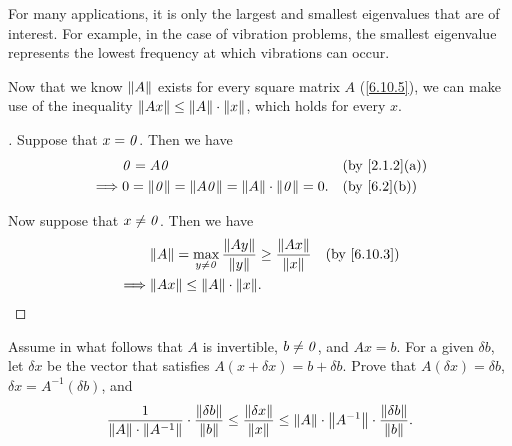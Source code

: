 \begin{note}
  For many applications, it is only the largest and smallest eigenvalues that are of interest.
  For example, in the case of vibration problems, the smallest eigenvalue represents the lowest frequency at which vibrations can occur.
\end{note}

\begin{cor}\label{6.10.8}
  Now that we know \(\left\lVert A\right\rVert\) exists for every square matrix \(A\) (\cref{6.10.5}), we can make use of the inequality \(\left\lVert Ax\right\rVert \leq \left\lVert A\right\rVert \cdot \left\lVert x\right\rVert\), which holds for every \(x\).
\end{cor}

\begin{proof}[]
  Suppose that \(x = \mathit{0}\).
  Then we have
  \begin{align*}
             & \zv = A \zv                                                    &  & \by{2.1.2}[a] \\
    \implies & 0 = \norm{\zv} = \norm{A \zv} = \norm{A} \cdot \norm{\zv} = 0. &  & \by{6.2}[b]
  \end{align*}

  Now suppose that \(x \neq \mathit{0}\).
  Then we have
  \begin{align*}
             & \norm{A} = \max_{y \neq \zv} \dfrac{\norm{Ay}}{\norm{y}} \geq \dfrac{\norm{Ax}}{\norm{x}} &  & \by{6.10.3} \\
    \implies & \norm{Ax} \leq \norm{A} \cdot \norm{x}.
  \end{align*}
\end{proof}

\begin{cor}\label{6.10.9}
  Assume in what follows that \(A\) is invertible, \(b \neq \mathit{0}\), and \(Ax = b\).
  For a given \(\delta b\), let \(\delta x\) be the vector that satisfies \(A(x + \delta x) = b + \delta b\).
  Prove that \(A(\delta x) = \delta b\), \(\delta x = A^{-1} (\delta b)\), and
  \[
    \dfrac{1}{\left\lVert A\right\rVert \cdot \left\lVert A^{-1}\right\rVert} \cdot \dfrac{\left\lVert\delta b\right\rVert}{\left\lVert b\right\rVert} \leq \dfrac{\left\lVert\delta x\right\rVert}{\left\lVert x\right\rVert} \leq \left\lVert A\right\rVert \cdot \left\lVert A^{-1}\right\rVert \cdot \dfrac{\left\lVert\delta b\right\rVert}{\left\lVert b\right\rVert}.
  \]
\end{cor}

